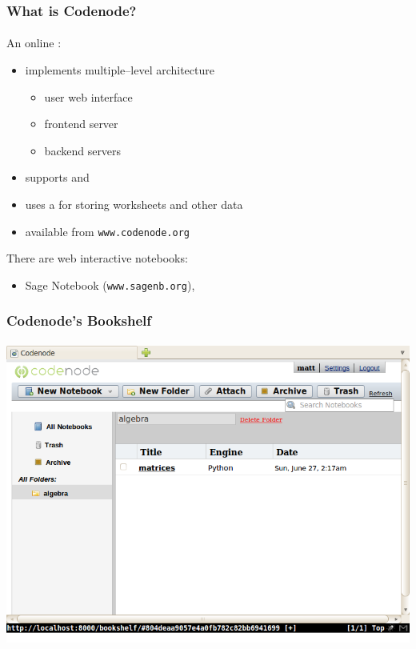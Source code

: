 \documentclass{beamer}
\begin{document}
\begin{frame}
    \frametitle{What is Codenode?}
    \framesubtitle{}

    An  online :
    \begin{itemize}
        \pause
        \item implements multiple--level architecture
            \begin{itemize}
                \pause
                \item user web interface
                \pause
                \item frontend server
                \pause
                \item backend servers
            \end{itemize}
        \pause
        \item supports  and 
        \pause
        \item uses a  for storing worksheets and other data
        \pause
        \item available from \texttt{www.codenode.org}
    \end{itemize}
    \pause
    There are  web interactive notebooks:
    \begin{itemize}
        \pause
        \item Sage Notebook (\texttt{www.sagenb.org}), \structure{\ldots}
    \end{itemize}
\end{frame}

\begin{frame}
    \frametitle{Codenode's Bookshelf}
    \framesubtitle{}

    \begin{center}
        \includegraphics[scale=0.45]{images/codenode-bookshelf.png}
    \end{center}
\end{frame}
\end{document}
